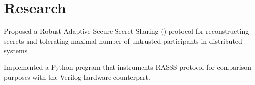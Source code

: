 \documentclass[]{deedy_format_Hien}
\begin{document}
\begin{minipage}[t]{0.66\textwidth}

\section{Research}
\vspace{\topsep} %
\vspace{-2.5mm}
\justify
\begin{tightemize}
\item Proposed a Robust Adaptive Secure Secret Sharing () protocol for reconstructing secrets and tolerating maximal number of untrusted participants in distributed systems.
\item Implemented a Python program that instruments RASSS protocol for comparison purposes with the Verilog hardware counterpart.
\end{tightemize}
\vspace{\topsep}
\sectionsep




\end{minipage}
\end{document}
